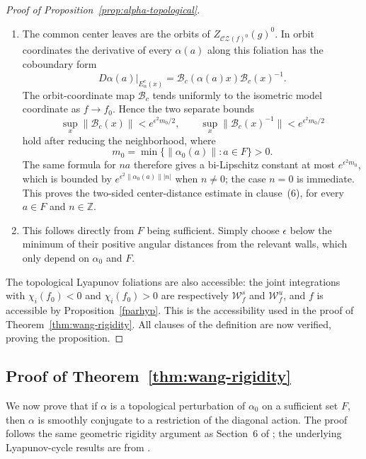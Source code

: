 \documentclass[11pt]{amsart}
\numberwithin{equation}{section}
\newcommand{\CZ}{\mathcal{CZ}}
\theoremstyle{plain}
\begin{document}
\begin{proof}[Proof of Proposition~\ref{prop:alpha-topological}]
\begin{enumerate}
\item The common center leaves are the orbits of
$Z_{\CZ(f)^0}(g)^0$.  In orbit coordinates the derivative of every
$\alpha(a)$ along this foliation has the coboundary form
\[
D\alpha(a)|_{E^c_\alpha(x)}
=\mathcal B_c(\alpha(a)x)\mathcal B_c(x)^{-1}.
\]
The orbit-coordinate map $\mathcal B_c$ tends uniformly to the isometric model
coordinate as $f\to f_0$.  Hence the two separate bounds
\[
 \sup_x\|\mathcal B_c(x)\|<e^{\epsilon^2m_0/2},
 \qquad
 \sup_x\|\mathcal B_c(x)^{-1}\|<e^{\epsilon^2m_0/2}
\]
hold after reducing the neighborhood, where
\[
m_0=\min\{\|\alpha_0(a)\|:a\in F\}>0.
\]
The same formula for $na$ therefore gives a bi-Lipschitz constant at most
$e^{\epsilon^2m_0}$, which is bounded by
$e^{\epsilon^2\|\alpha_0(a)\||n|}$ when $n\ne0$; the case $n=0$ is
immediate.  This proves the two-sided center-distance estimate in
clause~(6), for every $a\in F$ and $n\in\mathbb Z$.

\item This follows directly from $F$ being sufficient. Simply choose $\epsilon$ below the minimum of
their positive angular distances from the relevant walls, which only depend on $\alpha_0$ and $F$. 
\end{enumerate}

The topological Lyapunov foliations are also accessible: the joint
integrations with $\chi_i(f_0)<0$ and $\chi_i(f_0)>0$ are respectively
$\mathcal W^s_f$ and $\mathcal W^u_f$, and $f$ is accessible by
Proposition~\ref{fparhyp}.  This is the accessibility used in the proof
of Theorem~\ref{thm:wang-rigidity}.  All clauses of the definition are
now verified, proving the proposition.
\end{proof}

\subsection{Proof of Theorem~\ref{thm:wang-rigidity}}
\label{app:proof-wang-rigidity}

We now prove that if $\alpha$ is a topological perturbation of $\alpha_0$
on a sufficient set $F$, then $\alpha$ is smoothly conjugate to a restriction
of the diagonal action.  The proof follows the same geometric rigidity
argument as Section~6 of \cite{Wang26}; the underlying Lyapunov-cycle
results are from \cite{VinWang}.
\end{document}
